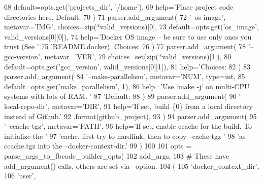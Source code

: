 \begin{DoxyCode}
{{{68             default=opts.get(\textcolor{stringliteral}{'projects\_dir'}, \textcolor{stringliteral}{'/home'}),
69             help=\textcolor{stringliteral}{'Place project code directories here. Default: %
70         )
71         parser.add\_argument(
72             \textcolor{stringliteral}{'--os-image'}, metavar=\textcolor{stringliteral}{'IMG'}, choices=zip(*valid\_versions)[0],
73             default=opts.get(\textcolor{stringliteral}{'os\_image'}, valid\_versions[0][0]),
74             help=\textcolor{stringliteral}{'Docker OS image -- be sure to use only ones you trust (See '}
75                 \textcolor{stringliteral}{'README.docker). Choices: %
76         )
77         parser.add\_argument(
78             \textcolor{stringliteral}{'--gcc-version'}, metavar=\textcolor{stringliteral}{'VER'},
79             choices=set(zip(*valid\_versions)[1]),
80             default=opts.get(\textcolor{stringliteral}{'gcc\_version'}, valid\_versions[0][1]),
81             help=\textcolor{stringliteral}{'Choices: %
82         )
83         parser.add\_argument(
84             \textcolor{stringliteral}{'--make-parallelism'}, metavar=\textcolor{stringliteral}{'NUM'}, type=int,
85             default=opts.get(\textcolor{stringliteral}{'make\_parallelism'}, 1),
86             help=\textcolor{stringliteral}{'Use `make -j` on multi-CPU systems with lots of RAM. '}
87                 \textcolor{stringliteral}{'Default: %
88         )
89         parser.add\_argument(
90             \textcolor{stringliteral}{'--local-repo-dir'}, metavar=\textcolor{stringliteral}{'DIR'},
91             help=\textcolor{stringliteral}{'If set, build \{0\} from a local directory instead of Github.'}
92                 .format(github\_project),
93         )
94         parser.add\_argument(
95             \textcolor{stringliteral}{'--ccache-tgz'}, metavar=\textcolor{stringliteral}{'PATH'},
96             help=\textcolor{stringliteral}{'If set, enable ccache for the build. To initialize the '}
97                  \textcolor{stringliteral}{'cache, first try to hardlink, then to copy --cache-tgz '}
98                  \textcolor{stringliteral}{'as ccache.tgz into the --docker-context-dir.'}
99         )
100 
101     opts = parse_args_to_fbcode_builder_opts(
102         add\_args,
103         \textcolor{comment}{# These have add\_argument() calls, others are set via --option.}
104         (
105             \textcolor{stringliteral}{'docker\_context\_dir'},
106             \textcolor{stringliteral}{'user'},
}}}}}}}
\end{DoxyCode}
